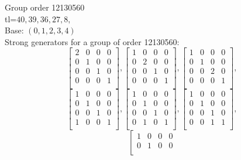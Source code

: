 \documentclass{article}
\begin{document}
{Group order 12130560\\
tl=$40, 39, 36, 27, 8, $\\
Base: $( 0, 1, 2, 3, 4 )$\\
{\small\arraycolsep=2pt
Strong generators for a group of order 12130560:
$$
\left[
\begin{array}{*{4}{r}}
2 & 0 & 0 & 0\\
0 & 1 & 0 & 0\\
0 & 0 & 1 & 0\\
0 & 0 & 0 & 1\\
\end{array}
\right]
, 
\left[
\begin{array}{*{4}{r}}
1 & 0 & 0 & 0\\
0 & 2 & 0 & 0\\
0 & 0 & 1 & 0\\
0 & 0 & 0 & 1\\
\end{array}
\right]
, 
\left[
\begin{array}{*{4}{r}}
1 & 0 & 0 & 0\\
0 & 1 & 0 & 0\\
0 & 0 & 2 & 0\\
0 & 0 & 0 & 1\\
\end{array}
\right]
, 
$$
$$
\left[
\begin{array}{*{4}{r}}
1 & 0 & 0 & 0\\
0 & 1 & 0 & 0\\
0 & 0 & 1 & 0\\
1 & 0 & 0 & 1\\
\end{array}
\right]
, 
\left[
\begin{array}{*{4}{r}}
1 & 0 & 0 & 0\\
0 & 1 & 0 & 0\\
0 & 0 & 1 & 0\\
0 & 1 & 0 & 1\\
\end{array}
\right]
, 
\left[
\begin{array}{*{4}{r}}
1 & 0 & 0 & 0\\
0 & 1 & 0 & 0\\
0 & 0 & 1 & 0\\
0 & 0 & 1 & 1\\
\end{array}
\right]
, 
$$
$$
\left[
\begin{array}{*{4}{r}}
1 & 0 & 0 & 0\\
0 & 1 & 0 & 0\\

\end{array}$$}}
\end{document}
